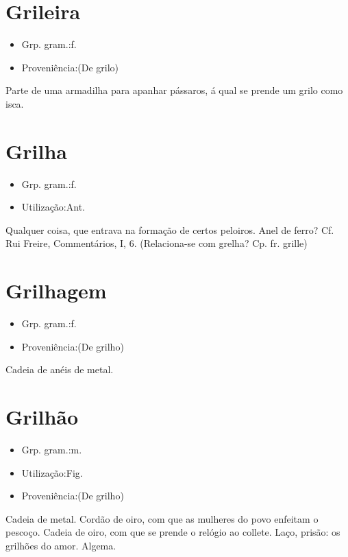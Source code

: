 \section{Grileira}
\begin{itemize}
\item {Grp. gram.:f.}
\end{itemize}
\begin{itemize}
\item {Proveniência:(De \textunderscore grilo\textunderscore )}
\end{itemize}
Parte de uma armadilha para apanhar pássaros, á qual se prende um grilo como isca.
\section{Grilha}
\begin{itemize}
\item {Grp. gram.:f.}
\end{itemize}
\begin{itemize}
\item {Utilização:Ant.}
\end{itemize}
Qualquer coisa, que entrava na formação de certos peloiros.
Anel de ferro? Cf. Rui Freire, \textunderscore Commentários\textunderscore , I, 6.
(Relaciona-se com \textunderscore grelha\textunderscore ? Cp. fr. \textunderscore grille\textunderscore )
\section{Grilhagem}
\begin{itemize}
\item {Grp. gram.:f.}
\end{itemize}
\begin{itemize}
\item {Proveniência:(De \textunderscore grilho\textunderscore )}
\end{itemize}
Cadeia de anéis de metal.
\section{Grilhão}
\begin{itemize}
\item {Grp. gram.:m.}
\end{itemize}
\begin{itemize}
\item {Utilização:Fig.}
\end{itemize}
\begin{itemize}
\item {Proveniência:(De \textunderscore grilho\textunderscore )}
\end{itemize}
Cadeia de metal.
Cordão de oiro, com que as mulheres do povo enfeitam o pescoço.
Cadeia de oiro, com que se prende o relógio ao collete.
Laço, prisão: \textunderscore os grilhões do amor\textunderscore .
Algema.
